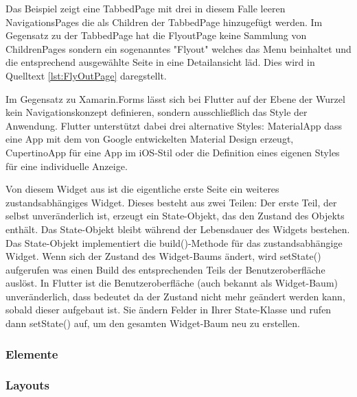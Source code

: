Das Beispiel zeigt eine TabbedPage mit drei in diesem Falle leeren NavigationsPages die als Children der TabbedPage hinzugefügt werden.  Im Gegensatz zu der TabbedPage hat die FlyoutPage keine Sammlung von ChildrenPages sondern ein sogenanntes "Flyout" welches das Menu beinhaltet und die entsprechend ausgewählte Seite in eine Detailansicht läd.  Dies wird in Quelltext \ref{lst:FlyOutPage} daregstellt.

\begin{minipage}{\linewidth}

\end{minipage}

Im Gegensatz zu Xamarin.Forms lässt sich bei Flutter auf der Ebene der Wurzel kein Navigationskonzept definieren,  sondern ausschließlich das Style der Anwendung.  Flutter unterstützt dabei drei alternative Styles: MaterialApp dass eine App mit dem von Google entwickelten Material Design erzeugt,  CupertinoApp für eine App im iOS-Stil oder die Definition eines eigenen Styles für eine individuelle Anzeige.

\begin{minipage}{\linewidth}

\end{minipage}

Von diesem Widget aus ist die eigentliche erste Seite ein weiteres zustandsabhängiges Widget. Dieses besteht aus zwei Teilen:  Der erste Teil, der selbst unveränderlich ist, erzeugt ein State-Objekt, das den Zustand des Objekts enthält.  Das State-Objekt bleibt während der Lebensdauer des Widgets bestehen.
Das State-Objekt implementiert die build()-Methode für das zustandsabhängige Widget.  Wenn sich der Zustand des Widget-Baums ändert,  wird setState() aufgerufen was einen Build des entsprechenden Teils der Benutzeroberfläche auslöst.  In Flutter ist die Benutzeroberfläche (auch bekannt als Widget-Baum) unveränderlich,  dass bedeutet da der Zustand nicht mehr geändert werden kann, sobald dieser aufgebaut ist.  Sie ändern Felder in Ihrer State-Klasse und rufen dann setState() auf, um den gesamten Widget-Baum neu zu erstellen.



\subsubsection{Elemente}
\subsubsection{Layouts}
